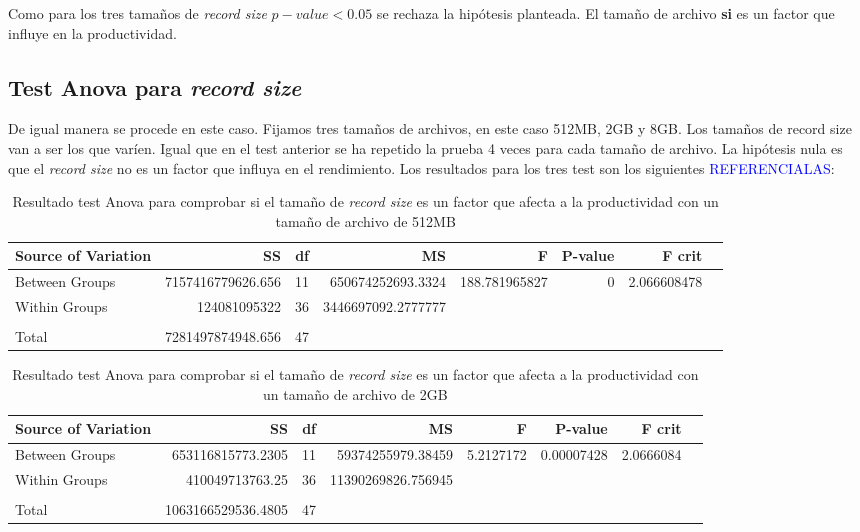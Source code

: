 Como para los tres tamaños de \textit{record size} $p-value < 0.05$ se rechaza la hipótesis planteada. El tamaño de archivo \textbf{si} es un factor que influye en la productividad.

\subsection{Test Anova para \textit{record size}}
De igual manera se procede en este caso. Fijamos tres tamaños de archivos, en este caso 512MB, 2GB y 8GB. Los tamaños de record size van a ser los que varíen. Igual que en el test anterior se ha repetido la prueba 4 veces para cada tamaño de archivo. La hipótesis nula es que el \textit{record size} no es un factor que influya en el rendimiento. Los resultados para los tres test son los siguientes \textcolor{blue}{REFERENCIALAS}:

\begin{table}[H]\centering
\scriptsize
\begin{tabular}{lrrrrrrr}\toprule
Source of Variation &SS &df &MS &F &P-value &F crit \\\midrule
Between Groups &7157416779626.656 &11 &650674252693.3324 &188.781965827 &0 &2.066608478 \\
Within Groups &124081095322 &36 &3446697092.2777777 & & & \\
& & & & & & \\
Total &7281497874948.656 &47 & & & & \\
\bottomrule
\end{tabular}
\caption{Resultado test Anova para comprobar si el tamaño de \textit{record size} es un factor que afecta a la productividad con un tamaño de archivo de 512MB}\label{tab: }
\end{table}

\begin{table}[H]\centering

\scriptsize
\begin{tabular}{lrrrrrrr}\toprule
Source of Variation &SS &df &MS &F &P-value &F crit \\\midrule
Between Groups &653116815773.2305 &11 &59374255979.38459 &5.2127172 &0.00007428 &2.0666084 \\
Within Groups &410049713763.25 &36 &11390269826.756945 & & & \\
& & & & & & \\
Total &1063166529536.4805 &47 & & & & \\
\bottomrule
\end{tabular}
\caption{Resultado test Anova para comprobar si el tamaño de \textit{record size} es un factor que afecta a la productividad con un tamaño de archivo de 2GB}\label{tab: }
\end{table}

